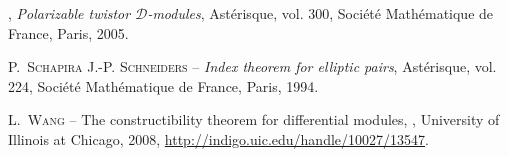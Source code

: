 \documentclass[english]{smfart}
\numberwithin{subsection}{section}
\numberwithin{equation}{section}
\theoremstyle{plain}
\theoremstyle{definition}
\begin{document}
\begin{thebibliography}{10}
\bysame , \emph{{Polarizable twistor $\mathcal{D}$-modules}}, Ast{\'e}risque,
  vol. 300, Soci{\'e}t{\'e} Math{\'e}matique de France, Paris, 2005.

{\scshape P.~Schapira {\normalfont \smfandname} J.-P. Schneiders} --
  \emph{Index theorem for elliptic pairs}, Ast{\'e}risque, vol. 224,
  Soci{\'e}t{\'e} Math{\'e}matique de France, Paris, 1994.

{\scshape L.~Wang} -- {\og The constructibility theorem for differential
  modules\fg}, \smfphdthesisname, University of Illinois at Chicago, 2008,
  \url{http://indigo.uic.edu/handle/10027/13547}.

\end{thebibliography}
\end{document}
